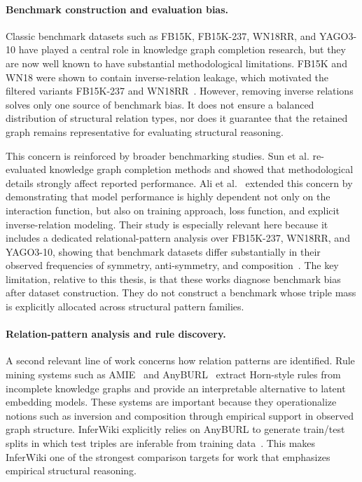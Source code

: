 \documentclass[12pt,a4paper]{article}
\begin{document}
\paragraph{Benchmark construction and evaluation bias.}
Classic benchmark datasets such as FB15K, FB15K-237, WN18RR, and YAGO3-10 have played a central role in knowledge graph completion research, but they are now well known to have substantial methodological limitations. FB15K and WN18 were shown to contain inverse-relation leakage, which motivated the filtered variants FB15K-237 and WN18RR~\cite{bordes2013transe,toutanova2015observed,dettmers2018conve}. However, removing inverse relations solves only one source of benchmark bias. It does not ensure a balanced distribution of structural relation types, nor does it guarantee that the retained graph remains representative for evaluating structural reasoning.

This concern is reinforced by broader benchmarking studies. Sun et al.\cite{sun2020reevaluation} re-evaluated knowledge graph completion methods and showed that methodological details strongly affect reported performance. Ali et al.~\cite{ali2022bringing} extended this concern by demonstrating that model performance is highly dependent not only on the interaction function, but also on training approach, loss function, and explicit inverse-relation modeling. Their study is especially relevant here because it includes a dedicated relational-pattern analysis over FB15K-237, WN18RR, and YAGO3-10, showing that benchmark datasets differ substantially in their observed frequencies of symmetry, anti-symmetry, and composition~\cite{ali2022bringing}. The key limitation, relative to this thesis, is that these works diagnose benchmark bias after dataset construction. They do not construct a benchmark whose triple mass is explicitly allocated across structural pattern families.

\paragraph{Relation-pattern analysis and rule discovery.}
A second relevant line of work concerns how relation patterns are identified. Rule mining systems such as AMIE~\cite{galarraga2013amie} and AnyBURL~\cite{meilicke2019anyburl} extract Horn-style rules from incomplete knowledge graphs and provide an interpretable alternative to latent embedding models. These systems are important because they operationalize notions such as inversion and composition through empirical support in observed graph structure. InferWiki explicitly relies on AnyBURL to generate train/test splits in which test triples are inferable from training data~\cite{cao2021inferwiki}. This makes InferWiki one of the strongest comparison targets for work that emphasizes empirical structural reasoning.
\end{document}
